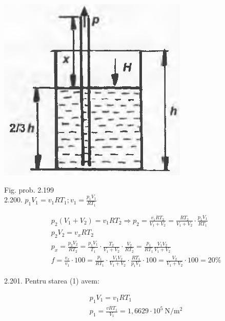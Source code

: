 \documentclass[10pt]{article}
\begin{document}
\begin{center}
\includegraphics[max width=\textwidth]{2025_07_01_5b3ff9fa0d508c8e9f17g-313}
\end{center}

Fig. prob. 2.199\\
2.200. $p_{1} V_{1}=v_{1} R T_{1} ; v_{1}=\frac{p_{1} V_{1}}{R T_{1}}$

$$
\begin{aligned}
& p_{2}\left(V_{1}+V_{2}\right)=v_{1} R T_{2} \Rightarrow p_{2}=\frac{v_{1} R T_{2}}{V_{1}+V_{2}}=\frac{R T_{2}}{V_{1}+V_{2}} \cdot \frac{p_{1} V_{1}}{R T_{1}} \\
& p_{2} V_{2}=v_{x} R T_{2} \\
& p_{x}=\frac{p_{2} V_{2}}{R T_{2}}=\frac{p_{1} V_{1}}{T_{1}} \cdot \frac{T_{2}}{V_{1}+V_{2}} \cdot \frac{V_{2}}{R T_{2}}=\frac{p_{1}}{R T_{1}} \frac{V_{1} V_{2}}{V_{1}+V_{2}} \\
& f=\frac{v_{x}}{v_{1}} \cdot 100=\frac{p_{1}}{R T_{1}} \cdot \frac{V_{1} V_{2}}{V_{1}+V_{2}} \cdot \frac{R T_{1}}{p_{1} V_{1}} \cdot 100=\frac{V_{2}}{V_{1}+V_{2}} \cdot 100=20 \%
\end{aligned}
$$

2.201. Pentru starea (1) avem:

$$
\begin{aligned}
& p_{1} V_{1}=v_{1} R T_{1} \\
& p_{1}=\frac{v R T_{1}}{V_{1}}=1,6629 \cdot 10^{5} \mathrm{~N} / \mathrm{m}^{2}
\end{aligned}
$$
\end{document}
